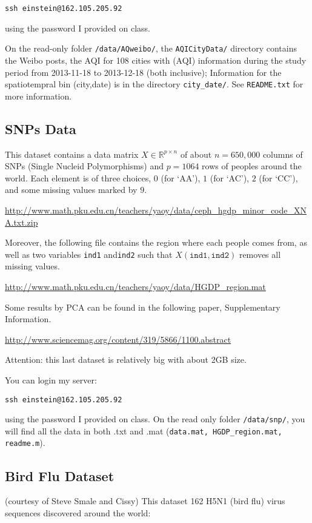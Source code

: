\documentclass[11pt]{article}
\def\R{{\mathbb R}}
\begin{document}
\texttt{ssh einstein@162.105.205.92}

\noindent using the password I provided on class. 

On the read-only folder \texttt{/data/AQweibo/}, the \texttt{AQICityData/} directory contains the Weibo posts, the AQI for 108 cities with (AQI) information during the study period
from 2013-11-18 to 2013-12-18 (both inclusive); Information for the spatiotempral bin (city,date) is in the directory \texttt{city\_date/}. See \texttt{README.txt} for more information.



\subsection{SNPs Data}
 This dataset contains a data matrix $X\in \R^{p\times n}$ of about $n=650,000$ columns of SNPs (Single Nucleid Polymorphisms) and $p=1064$ rows of peoples around the world. Each element is of three choices, $0$ (for `AA'), $1$ (for `AC'), $2$ (for `CC'), and some missing values marked by $9$. 

\url{http://www.math.pku.edu.cn/teachers/yaoy/data/ceph_hgdp_minor_code_XNA.txt.zip}

Moreover, the following file contains the region where each people comes from, as well as two variables {\texttt{ind1}} and{\texttt{ind2}} such that $X({\texttt{ind1}},{\texttt{ind2}})$ removes all missing values. 

\url{http://www.math.pku.edu.cn/teachers/yaoy/data/HGDP_region.mat}

Some results by PCA can be found in the following paper, Supplementary Information. 

\url{http://www.sciencemag.org/content/319/5866/1100.abstract}

Attention: this last dataset is relatively big with about 2GB size. 

You can login my server:

\texttt{ssh einstein@162.105.205.92}

\noindent using the password I provided on class. On the read only folder \texttt{/data/snp/}, you will find all the data in both .txt and .mat (\texttt{data.mat, HGDP\_region.mat, readme.m}).



\subsection{Bird Flu Dataset} (courtesy of Steve Smale and Cissy) This dataset 162 H5N1 (bird flu) virus sequences discovered around the world:
\end{document}

